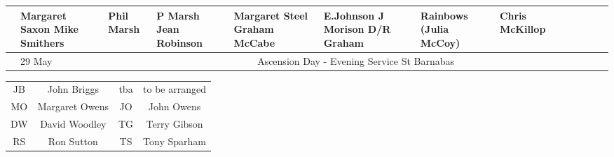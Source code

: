 \documentclass[10pt,a4paper]{article}
\begin{document}
\begin{center}
{\begin{tabular}{|l|p{1.6cm}|p{1.4cm}|p{1.0cm}|p{0.8cm}|p{3.0cm}|p{2cm}|p{1.5cm}|p{2cm}|p{2cm}|p{1.9cm}
|p{2cm}|p{1.6cm}|}
    &  Margaret Saxon \linebreak Mike Smithers & 
Phil Marsh &  P Marsh \linebreak Jean Robinson & 
Margaret Steel \linebreak Graham McCabe &
E.Johnson   \linebreak J Morison  D/R Graham
&  Rainbows \linebreak (Julia McCoy) &   Chris \linebreak McKillop\\
\hline
& 29 May  & \multicolumn{11}{|c|}{\rule[-1mm]{0mm}{6mm}
  Ascension Day - Evening Service St Barnabas}
    \\ 
\hline
\end{tabular}
}

\begin{tabular}{|c|c|c|c|}\hline
JB & John Briggs &  tba & to be arranged  \\ %
 MO & Margaret Owens & JO & John Owens\\
 DW  & David Woodley & TG & Terry Gibson \\
 RS & Ron Sutton & TS & Tony Sparham  \\
   \hline
\end{tabular}
\end{center}
\end{document}
